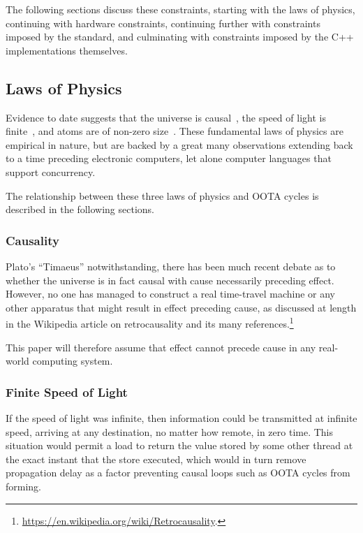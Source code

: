 \documentclass[10]{article}
\begin{document}
The following sections discuss these constraints, starting with the
laws of physics, continuing with hardware constraints, continuing
further with constraints imposed by the standard, and culminating
with constraints imposed by the C++ implementations themselves.

\subsection{Laws of Physics}
\label{sec:Laws of Physics}

Evidence to date suggests that the universe is
causal~\cite{Plato360BC-causality},
the speed of light is finite~\cite{OleRoemer1671SpeedOfLight}, and
atoms are of non-zero size~\cite{JeanBaptistePerrin1923AtomSize}.
These fundamental laws of physics are empirical in nature, but
are backed by a great many observations extending back to a time
preceding electronic computers, let alone computer languages that
support concurrency.

The relationship between these three laws of physics and OOTA
cycles is described in the following sections.

\subsubsection{Causality}
\label{sec:Causality}

Plato's ``Timaeus'' notwithstanding, there has been much recent debate
as to whether the universe is in fact causal with cause necessarily
preceding effect.
However, no one has managed to construct a real time-travel machine
or any other apparatus that might result in effect preceding cause,
as discussed at length in the Wikipedia article on retrocausality and
its many references.\footnote{
	\url{https://en.wikipedia.org/wiki/Retrocausality}.}

This paper will therefore assume that effect cannot precede cause in
any real-world computing system.

\subsubsection{Finite Speed of Light}
\label{sec:Finite Speed of Light}

If the speed of light was infinite, then information could be transmitted
at infinite speed, arriving at any destination, no matter how remote,
in zero time.
This situation would permit a load to return the value stored by some
other thread at the exact instant that the store executed, which
would in turn remove propagation delay as a factor preventing
causal loops such as OOTA cycles from forming.
\end{document}
